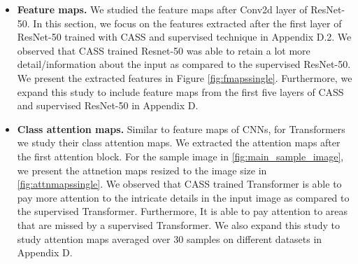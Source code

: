 \begin{itemize}

\item \textbf{Feature maps.} We studied the feature maps after Conv2d layer of ResNet-50. In this section, we focus on the features extracted after the first layer of ResNet-50 trained with CASS and supervised technique in Appendix D.2. We observed that CASS trained Resnet-50 was able to retain a lot more detail/information about the input as compared to the supervised ResNet-50. We present the extracted features in Figure \ref{fig:fmapssingle}. Furthermore, we expand this study to include feature maps from the first five layers of CASS and supervised ResNet-50 in Appendix D.

\item \textbf{Class attention maps.} Similar to feature maps of CNNs, for Transformers we study their class attention maps. We extracted the attention maps after the first attention block. For the sample image in \ref{fig:main_sample_image}, we present the attnetion maps resized to the image size in \ref{fig:attnmapssingle}. We observed that CASS trained Transformer is able to pay more attention to the intricate details in the input image as compared to the supervised Transformer. Furthermore, It is able to pay attention to areas that are missed by a supervised Transformer. We also expand this study to study attention maps averaged over 30 samples on different datasets in Appendix D. 

\end{itemize}
